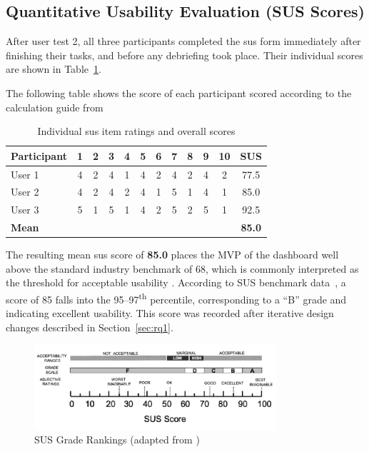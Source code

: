 \subsection{Quantitative Usability Evaluation (SUS Scores)}
\label{subsec:quant_sus}
After user test 2, all three participants completed the \acrshort{sus} form immediately after finishing their tasks, and before any debriefing took place. Their individual scores are shown in Table~\ref{tab:sus-scores}.

The following table shows the score of each participant scored according to the calculation guide from 

\begin{table}[H]
\centering
\begin{tabular}{@{}lccccccccccc@{}}
\toprule
\textbf{Participant} & \textbf{1} & \textbf{2} & \textbf{3} & \textbf{4} & \textbf{5} & \textbf{6} & \textbf{7} & \textbf{8} & \textbf{9} & \textbf{10} & \textbf{SUS} \\
\midrule
User 1 & 4 & 2 & 4 & 1 & 4 & 2 & 4 & 2 & 4 & 2 & 77.5 \\
User 2 & 4 & 2 & 4 & 2 & 4 & 1 & 5 & 1 & 4 & 1 & 85.0 \\
User 3 & 5 & 1 & 5 & 1 & 4 & 2 & 5 & 2 & 5 & 1 & 92.5 \\
\midrule
\textbf{Mean} &  &  &  &  &  &  &  &  &  &  & \textbf{85.0} \\
\bottomrule
\end{tabular}
\caption{Individual \acrshort{sus} item ratings and overall scores}
\label{tab:sus-scores}
\end{table}


The resulting mean \acrshort{sus} score of \textbf{85.0} places the MVP of the dashboard well above the standard industry benchmark of 68, which is commonly interpreted as the threshold for acceptable usability \autocite{MeasuringSUS2011}. According to SUS benchmark data~\autocite{Bangor2009}, a score of 85 falls into the 95–97\textsuperscript{th} percentile, corresponding to a “B” grade and indicating excellent usability. This score was recorded after iterative design changes described in Section~\ref{sec:rq1}.

\begin{figure}[H]
    \centering
    \includegraphics[width=0.8\textwidth]{figures/Grade-rankings-of-SUS-scores-from-An-Empirical-Evaluation-of-the-System-Usability.png}
    \caption{SUS Grade Rankings (adapted from \cite{Bangor2009})}
    \label{fig:sus_scores}
\end{figure}



